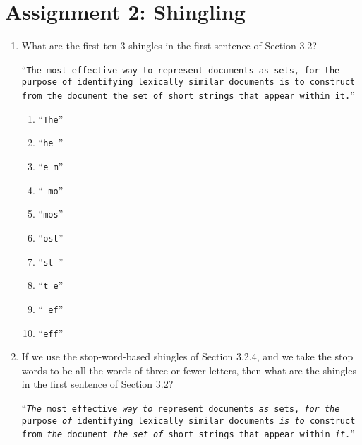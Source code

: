 \documentclass{article}
\begin{document}
\section{Assignment 2: Shingling}
\renewcommand{\labelenumii}{\arabic{enumii}.}
\begin{enumerate}
\item{What are the first ten 3-shingles in the first sentence of Section 3.2?

\textquotedblleft\texttt{The most effective way to represent documents as sets, for the purpose of identifying lexically similar documents is to construct from the document the set of short strings that appear within it.}\textquotedblright
\begin{multicols}{2}
	\begin{enumerate}
		\item{\textquotedblleft\texttt{The}\textquotedblright}
		\item{\textquotedblleft\texttt{he }\textquotedblright}
		\item{\textquotedblleft\texttt{e m}\textquotedblright}
		\item{\textquotedblleft\texttt{ mo}\textquotedblright}
		\item{\textquotedblleft\texttt{mos}\textquotedblright}
		\item{\textquotedblleft\texttt{ost}\textquotedblright}
		\item{\textquotedblleft\texttt{st }\textquotedblright}
		\item{\textquotedblleft\texttt{t e}\textquotedblright}
		\item{\textquotedblleft\texttt{ ef}\textquotedblright}
		\item{\textquotedblleft\texttt{eff}\textquotedblright}
	\end{enumerate}
\end{multicols}

}
\item{If we use the stop-word-based shingles of Section 3.2.4, and we take the stop words to be all the words of three or fewer letters, then what are the shingles in the first sentence of Section 3.2?

\textquotedblleft\texttt{\emph{The} most effective \emph{way} \emph{to} represent documents \emph{as} sets, \emph{for} \emph{the} purpose \emph{of} identifying lexically similar documents \emph{is} \emph{to} construct from \emph{the} document \emph{the} \emph{set} \emph{of} short strings that appear within \emph{it}.}\textquotedblright

}
\end{enumerate}
\end{document}
